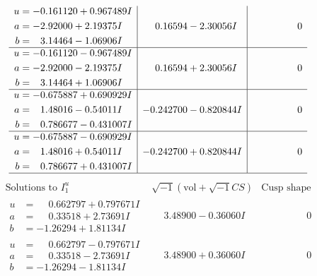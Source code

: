 \documentclass[1p]{elsarticle_modified}
\theoremstyle{definition}
\newcommand{\I}{\sqrt{-1}}
\begin{document}
$$\begin{array}{c|c|c}
\begin{aligned}
u &= -0.161120 + 0.967489 I \\
a &= -2.92000 + 2.19375 I \\
b &= \phantom{-}3.14464 - 1.06906 I\end{aligned}
 & \phantom{-}0.16594 - 2.30056 I & \phantom{-0.000000 } 0 \\ \hline\begin{aligned}
u &= -0.161120 - 0.967489 I \\
a &= -2.92000 - 2.19375 I \\
b &= \phantom{-}3.14464 + 1.06906 I\end{aligned}
 & \phantom{-}0.16594 + 2.30056 I & \phantom{-0.000000 } 0 \\ \hline\begin{aligned}
u &= -0.675887 + 0.690929 I \\
a &= \phantom{-}1.48016 - 0.54011 I \\
b &= \phantom{-}0.786677 - 0.431007 I\end{aligned}
 & -0.242700 - 0.820844 I & \phantom{-0.000000 } 0 \\ \hline\begin{aligned}
u &= -0.675887 - 0.690929 I \\
a &= \phantom{-}1.48016 + 0.54011 I \\
b &= \phantom{-}0.786677 + 0.431007 I\end{aligned}
 & -0.242700 + 0.820844 I & \phantom{-0.000000 } 0\\
 \hline 
 \end{array}$$\newpage$$\begin{array}{c|c|c}  
\text{Solutions to }I^u_{1}& \I (\text{vol} + \sqrt{-1}CS) & \text{Cusp shape}\\
 \hline 
\begin{aligned}
u &= \phantom{-}0.662797 + 0.797671 I \\
a &= \phantom{-}0.33518 + 2.73691 I \\
b &= -1.26294 + 1.81134 I\end{aligned}
 & \phantom{-}3.48900 - 0.36060 I & \phantom{-0.000000 } 0 \\ \hline\begin{aligned}
u &= \phantom{-}0.662797 - 0.797671 I \\
a &= \phantom{-}0.33518 - 2.73691 I \\
b &= -1.26294 - 1.81134 I\end{aligned}
 & \phantom{-}3.48900 + 0.36060 I & \phantom{-0.000000 } 0 \\ \hline\begin{aligned}

\end{aligned}
\end{array}$$
\end{document}
